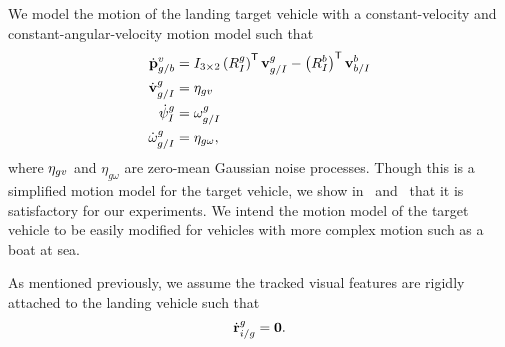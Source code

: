We model the motion of the landing target vehicle
with a constant-velocity and constant-angular-velocity motion model such that
\begin{align}
  \dot{\mathrm{\mathbf{p}}}_{g/b}^{v} &= I_{3 \times 2} \left( R_{I}^{g} \right)^{\mathsf{T}}
   \mathrm{\mathbf{v}}_{g/I}^{g} - \left( R_{I}^{b} \right)^{\mathsf{T}}
  \mathrm{\mathbf{v}}_{b/I}^{b} \label{eq:goal_dynamics} \\
  \dot{\mathrm{\mathbf{v}}}_{g/I}^{g} &= \mathrm{\mathbf{\eta}}_{gv} \nonumber \\
  \dot{\psi}_{I}^{g} &= \omega_{g/I}^g \nonumber \\
  \dot{\omega}_{g/I}^{g} &= \eta_{g\omega}, \nonumber
\end{align}
where $\mathrm{\mathbf{\eta}}_{gv}$ and $\eta_{g\omega}$ are zero-mean Gaussian noise
processes. Though this is a simplified motion model for the target
vehicle, we show in~
and~ that it is
satisfactory for our experiments. We intend the motion model of the target
vehicle to be easily modified for vehicles with more complex motion such
as a boat at sea.

As mentioned previously, we assume the tracked visual features are rigidly
attached to the landing vehicle such that
\begin{equation}
  \dot{\mathrm{\mathbf{r}}}_{i/g}^g = \mathrm{\mathbf{0}}. \label{eq:feature_dynamics}
\end{equation}

